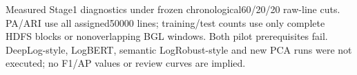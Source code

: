 Measured Stage1 diagnostics under frozen chronological60/20/20 raw-line cuts. PA/ARI use all assigned50000 lines; training/test counts use only complete HDFS blocks or nonoverlapping BGL windows. Both pilot prerequisites fail. DeepLog-style, LogBERT, semantic LogRobust-style and new PCA runs were not executed; no F1/AP values or review curves are implied.
